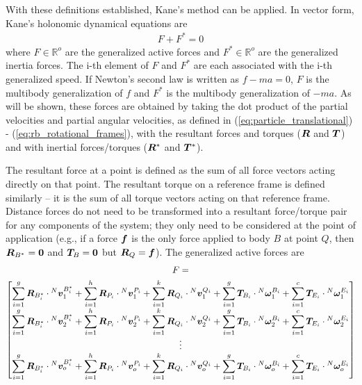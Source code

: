 With these definitions established, Kane's method can be applied. In vector
form, Kane's holonomic dynamical equations are
\begin{align}
\label{eq:kanes_eq}
F + F^* = 0
\end{align}
where $F\in\mathbb{R}^o$ are the generalized active forces and
$F^*\in\mathbb{R}^o$ are the generalized inertia forces. The i-th element of
$F$ and $F^*$ are each associated with the i-th generalized speed. If Newton's
second law is written as $f - ma = 0$, $F$ is the multibody generalization of
$f$ and $F^*$ is the multibody generalization of $-ma$. As will be shown, these
forces are obtained by taking the dot product of the partial velocities and
partial angular velocities, as defined in (\ref{eq:particle_translational}) -
(\ref{eq:rb_rotational_frames}), with the resultant forces and torques
($\boldsymbol{R}$ and $\boldsymbol{T}$) and with inertial forces/torques ($\boldsymbol{R}^*$ and
$\boldsymbol{T}^*$).

The resultant force at a point is defined as the sum of all force vectors
acting directly on that point. The resultant torque on a reference frame is
defined similarly -- it is the sum of all torque vectors acting on that
reference frame. Distance forces do not need to be transformed into a resultant
force/torque pair for any components of the system; they only need to be
considered at the point of application (e.g., if a force $\boldsymbol{f}$ is the only
force applied to body $B$ at point $Q$, then $\boldsymbol{R}_{B^*}=\boldsymbol{0}$ and
$\boldsymbol{T}_B=\boldsymbol{0}$ but $\boldsymbol{R}_Q=\boldsymbol{f}$). The generalized active forces are
\begin{multline}
\label{eq:definition_F}
F =\\
\begin{bmatrix}
\displaystyle \sum_{i=1}^g \boldsymbol{R}_{B^*_i} \cdot {^N}\boldsymbol{v}^{B^*_i}_1 +
\sum_{i=1}^h \boldsymbol{R}_{P_i} \cdot {^N}\boldsymbol{v}^{P_i}_1 +
\sum_{i=1}^k \boldsymbol{R}_{Q_i} \cdot {^N}\boldsymbol{v}^{Q_i}_1 +
\sum_{i=1}^g \boldsymbol{T}_{B_i} \cdot {^N}\boldsymbol{\omega}^{B_i}_1 +
\sum_{i=1}^c \boldsymbol{T}_{E_i} \cdot {^N}\boldsymbol{\omega}^{E_i}_1 \\
\displaystyle \sum_{i=1}^g \boldsymbol{R}_{B^*_i} \cdot {^N}\boldsymbol{v}^{B^*_i}_2 +
\sum_{i=1}^h \boldsymbol{R}_{P_i} \cdot {^N}\boldsymbol{v}^{P_i}_2 +
\sum_{i=1}^k \boldsymbol{R}_{Q_i} \cdot {^N}\boldsymbol{v}^{Q_i}_2 +
\sum_{i=1}^g \boldsymbol{T}_{B_i} \cdot {^N}\boldsymbol{\omega}^{B_i}_2 +
\sum_{i=1}^c \boldsymbol{T}_{E_i} \cdot {^N}\boldsymbol{\omega}^{E_i}_2 \\
\displaystyle \vdots \\
\displaystyle \sum_{i=1}^g \boldsymbol{R}_{B^*_i} \cdot {^N}\boldsymbol{v}^{B^*_i}_o +
\sum_{i=1}^h \boldsymbol{R}_{P_i} \cdot {^N}\boldsymbol{v}^{P_i}_o +
\sum_{i=1}^k \boldsymbol{R}_{Q_i} \cdot {^N}\boldsymbol{v}^{Q_i}_o +
\sum_{i=1}^g \boldsymbol{T}_{B_i} \cdot {^N}\boldsymbol{\omega}^{B_i}_o +
\sum_{i=1}^c \boldsymbol{T}_{E_i} \cdot {^N}\boldsymbol{\omega}^{E_i}_o
\end{bmatrix}
\end{multline}

